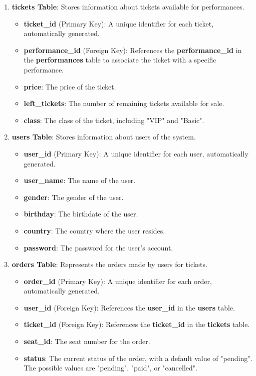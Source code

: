 \documentclass[12pt]{article}
\begin{document}
\begin{enumerate}
    \item \textbf{tickets Table}: Stores information about tickets available for performances. 
    \begin{itemize}
        \item \textbf{ticket\_id} (Primary Key): A unique identifier for each ticket, automatically generated.
        \item \textbf{performance\_id} (Foreign Key): References the \textbf{performance\_id} in the \textbf{performances} table to associate the ticket with a specific performance.
        \item \textbf{price}: The price of the ticket.
        \item \textbf{left\_tickets}: The number of remaining tickets available for sale. 
        \item \textbf{class}: The class of the ticket, including "VIP" and "Basic".
    \end{itemize}

    \item \textbf{users Table}: Stores information about users of the system. 
    \begin{itemize}
        \item \textbf{user\_id} (Primary Key): A unique identifier for each user, automatically generated.
        \item \textbf{user\_name}: The name of the user.
        \item \textbf{gender}: The gender of the user.
        \item \textbf{birthday}: The birthdate of the user.
        \item \textbf{country}: The country where the user resides.
        \item \textbf{password}: The password for the user's account.
    \end{itemize}

    \item \textbf{orders Table}: Represents the orders made by users for tickets. 
    \begin{itemize}
        \item \textbf{order\_id} (Primary Key): A unique identifier for each order, automatically generated.
        \item \textbf{user\_id} (Foreign Key): References the \textbf{user\_id} in the \textbf{users} table.
        \item \textbf{ticket\_id} (Foreign Key): References the \textbf{ticket\_id} in the \textbf{tickets} table.
        \item \textbf{seat\_id}: The seat number for the order.
        \item \textbf{status}: The current status of the order, with a default value of "pending". The possible values are "pending", "paid", or "cancelled".
    \end{itemize}


\end{enumerate}
\end{document}
